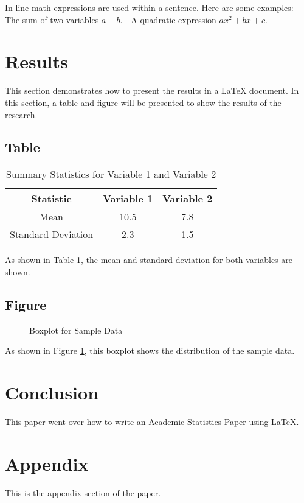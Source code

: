 \documentclass[11pt, oneside]{article}   	%
\begin{document}
In-line math expressions are used within a sentence. Here are some examples:
- The sum of two variables \( a + b \).
- A quadratic expression \( ax^2 + bx + c \).

\section{Results}
This section demonstrates how to present the results in a LaTeX document. In this section, a table and figure will be presented to show the results of the research.

\subsection{Table}
\begin{table}[h]
	\centering
	\begin{tabular}{|c|c|c|}
	\hline
	Statistic & Variable 1 & Variable 2 \\
	\hline
	Mean & 10.5 & 7.8 \\
	\hline
	Standard Deviation & 2.3 & 1.5 \\
	\hline
	\end{tabular}
	\caption{Summary Statistics for Variable 1 and Variable 2}
	\label{tab:summary_stats}
\end{table}

As shown in Table \ref{tab:summary_stats}, the mean and standard deviation for both variables are shown. 

\subsection{Figure}
\begin{figure}[h]
	\centering
	\caption{Boxplot for Sample Data}
	\label{fig:boxplot}
\end{figure}

As shown in Figure \ref{fig:boxplot}, this boxplot shows the distribution of the sample data.

\section{Conclusion}
This paper went over how to write an Academic Statistics Paper using LaTeX.

\appendix
\section{Appendix}
This is the appendix section of the paper.

\printbibliography
\end{document}
